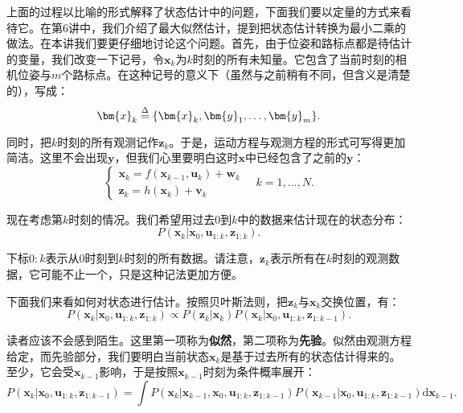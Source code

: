 上面的过程以比喻的形式解释了状态估计中的问题，下面我们要以定量的方式来看待它。在第6讲中，我们介绍了最大似然估计，提到把状态估计转换为最小二乘的做法。在本讲我们要更仔细地讨论这个问题。首先，由于位姿和路标点都是待估计的变量，我们改变一下记号，令$\bm{x}_k$为$k$时刻的所有未知量。它包含了当前时刻的相机位姿与$m$个路标点。在这种记号的意义下（虽然与之前稍有不同，但含义是清楚的），写成：
\begin{equation}
\bm{x}_k  \buildrel \Delta \over =  \{ \bm{x}_k, \bm{y}_1, \ldots, \bm{y}_m \}.
\end{equation}

同时，把$k$时刻的所有观测记作$\bm{z}_k$。于是，运动方程与观测方程的形式可写得更加简洁。这里不会出现$\bm{y}$，但我们心里要明白这时$\bm{x}$中已经包含了之前的$\bm{y}$：
\begin{equation}
\left\{ \begin{array}{l}
{\bm{x}_k} = f\left( {{\bm{x}_{k - 1}},{\bm{u}_k}} \right) + \bm{w}_k \\
{\bm{z}_{k}} = h\left( \bm{x}_k  \right)+ \bm{v}_{k}
\end{array} \right. \quad k=1, \ldots, N .
\end{equation}

现在考虑第$k$时刻的情况。我们希望用过去$0$到$k$中的数据来估计现在的状态分布：
\begin{equation}
P(\bm{x}_k | \bm{x}_0, \bm{u}_{1:k}, \bm{z}_{1:k}).
\end{equation}

下标$0:k$表示从$0$时刻到$k$时刻的所有数据。请注意，$\bm{z}_k$表示所有在$k$时刻的观测数据，它可能不止一个，只是这种记法更加方便。

下面我们来看如何对状态进行估计。按照贝叶斯法则，把$\bm{z}_k$与$\bm{x}_k$交换位置，有：
\begin{equation}
\label{eq:10-5}
P\left( {{\bm{x}_k}|{\bm{x}_0},{\bm{u}_{1:k}},{\bm{z}_{1:k}}} \right) \propto P\left( {{\bm{z}_k}|{\bm{x}_k}} \right) P\left( {{\bm{x}_k}|{\bm{x}_0},{\bm{u}_{1:k}},{\bm{z}_{1:k - 1}}} \right).
\end{equation}

读者应该不会感到陌生。这里第一项称为\textbf{似然}，第二项称为\textbf{先验}。似然由观测方程给定，而先验部分，我们要明白当前状态$\bm{x}_k$是基于过去所有的状态估计得来的。至少，它会受$\bm{x}_{k-1}$影响，于是按照$\bm{x}_{k-1}$时刻为条件概率展开：
\begin{equation}
\label{eq:bayes-estimator}
P\left( {{\bm{x}_k}|{\bm{x}_0},{\bm{u}_{1:k}},{\bm{z}_{1:k - 1}}} \right) = \int {P\left( {{\bm{x}_k}|{\bm{x}_{k - 1}},{\bm{x}_0},{\bm{u}_{1:k}},{\bm{z}_{1:k - 1}}} \right)P\left( {{\bm{x}_{k - 1}}|{\bm{x}_0},{\bm{u}_{1:k}},{\bm{z}_{1:k - 1}}} \right) \mathrm{d}\bm{x}_{k-1} }.
\end{equation}

